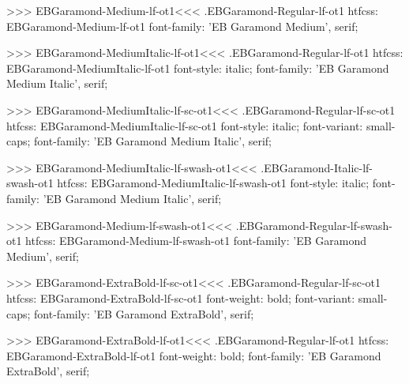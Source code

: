 {{{{{{{>>>
\<EBGaramond-Medium-lf-ot1\><<<
.EBGaramond-Regular-lf-ot1
htfcss:  EBGaramond-Medium-lf-ot1  font-family: 'EB Garamond Medium', serif;

>>>
\<EBGaramond-MediumItalic-lf-ot1\><<<
.EBGaramond-Regular-lf-ot1
htfcss:  EBGaramond-MediumItalic-lf-ot1  font-style: italic; font-family: 'EB Garamond Medium Italic', serif;

>>>
\<EBGaramond-MediumItalic-lf-sc-ot1\><<<
.EBGaramond-Regular-lf-sc-ot1
htfcss:  EBGaramond-MediumItalic-lf-sc-ot1  font-style: italic; font-variant: small-caps; font-family: 'EB Garamond Medium Italic', serif;

>>>
\<EBGaramond-MediumItalic-lf-swash-ot1\><<<
.EBGaramond-Italic-lf-swash-ot1
htfcss:  EBGaramond-MediumItalic-lf-swash-ot1  font-style: italic; font-family: 'EB Garamond Medium Italic', serif;

>>>
\<EBGaramond-Medium-lf-swash-ot1\><<<
.EBGaramond-Regular-lf-swash-ot1
htfcss:  EBGaramond-Medium-lf-swash-ot1  font-family: 'EB Garamond Medium', serif;

>>>
\<EBGaramond-ExtraBold-lf-sc-ot1\><<<
.EBGaramond-Regular-lf-sc-ot1
htfcss:  EBGaramond-ExtraBold-lf-sc-ot1  font-weight: bold; font-variant: small-caps; font-family: 'EB Garamond ExtraBold', serif;

>>>
\<EBGaramond-ExtraBold-lf-ot1\><<<
.EBGaramond-Regular-lf-ot1
htfcss:  EBGaramond-ExtraBold-lf-ot1  font-weight: bold; font-family: 'EB Garamond ExtraBold', serif;

}}}}}}}
